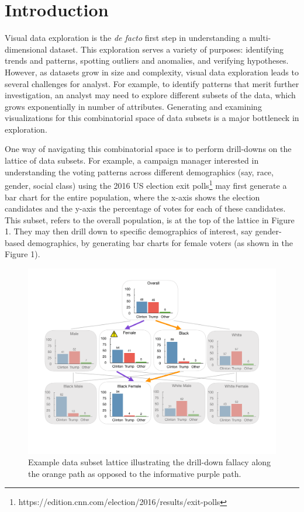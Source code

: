 \section{Introduction}

Visual data exploration is the \emph{de facto} first step in understanding a multi-dimensional dataset. This exploration serves a variety of purposes: identifying trends and patterns, spotting outliers and anomalies, and verifying hypotheses. However, as datasets grow in size and complexity, visual data exploration leads to several challenges for analyst. For example, to identify patterns that merit further investigation, an analyst may need to explore different subsets of the data, which grows exponentially in number of attributes. Generating and examining visualizations for this combinatorial space of data subsets is a major bottleneck in exploration.

One way of navigating this combinatorial space is to perform drill-downs on the lattice of data subsets. For example, a campaign manager interested in understanding the voting patterns across different demographics (say, race, gender, social class) using the 2016 US election exit polls\footnote{https://edition.cnn.com/election/2016/results/exit-polls} may first generate a bar chart for the entire population, where the x-axis shows the election candidates and the y-axis the percentage of votes for each of these candidates. This subset, refers to the overall population, is at the top of the lattice in Figure 1. They may then drill down to specific demographics of interest, say gender-based demographics, by generating bar charts for female voters (as shown in the Figure 1).

\begin{figure}[h!]
\includegraphics[width=\linewidth]{figures/elections_example_lattice_teaser.pdf}
\caption{Example data subset lattice illustrating the drill-down fallacy along the orange path as opposed to the informative purple path.}
\label{fig:elections_example}
\end{figure}

